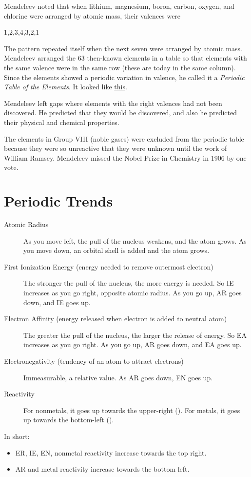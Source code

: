 \documentclass[a4paper, 8pt]{memoir}
\begin{document}
Mendeleev noted that when lithium, magnesium, boron, carbon, oxygen, and chlorine were arranged by atomic mass, their valences were
\begin{center}
1,2,3,4,3,2,1
\end{center}
The pattern repeated itself when the next seven were arranged by atomic mass. Mendeleev arranged the 63 then-known elements in a table so that elements with the same valence were in the same row (these are today in the same column). Since the elements showed a periodic variation in valence, he called it a \emph{Periodic Table of the Elements}. It looked like \href{http://bit.ly/15ceGf5}{this}.

Mendeleev left gaps where elements with the right valences had not been discovered. He predicted that they would be discovered, and also he predicted their physical and chemical properties. 

The elements in Group VIII (noble gases) were excluded from the periodic table because they were so unreactive that they were unknown until the work of William Ramsey. Mendeleev missed the Nobel Prize in Chemistry in 1906 by one vote.
\chapter{Periodic Trends}
\begin{description}
\item[Atomic Radius] As you move left, the pull of the nucleus weakens, and the atom grows. As you move down, an orbital shell is added and the atom grows.
\item[First Ionization Energy (energy needed to remove outermost electron)] The stronger the pull of the nucleus, the more energy is needed. So IE increases as you go right, opposite atomic radius. As you go up, AR goes down, and IE goes up.
\item[Electron Affinity (energy released when electron is added to neutral atom)] The greater the pull of the nucleus, the larger the release of energy. So EA increases as you go right. As you go up, AR goes down, and EA goes up.
\item[Electronegativity (tendency of an atom to attract electrons)] Immeasurable, a relative value. As AR goes down, EN goes up.
\item[Reactivity] For nonmetals, it goes up towards the upper-right (). For metals, it goes up towards the bottom-left ().
\end{description}

In short: 
\begin{itemize}
\item ER, IE, EN, nonmetal reactivity increase towards the top right. 
\item AR and metal reactivity increase towards the bottom left.
\end{itemize}
\end{document}
